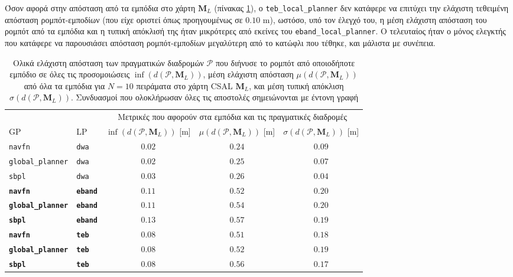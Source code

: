 Όσον αφορά στην απόσταση από τα εμπόδια στο χάρτη $\bm{M}_L$ (πίνακας
\ref{tbl:info_ground_truth_map_csal}), ο \texttt{teb\_local\_planner} δεν
κατάφερε να επιτύχει την ελάχιστη τεθειμένη απόσταση ρομπότ-εμποδίων (που είχε
οριστεί όπως προηγουμένως σε $0.10$ m), ωστόσο, υπό τον έλεγχό του, η μέση
ελάχιστη απόσταση του ρομπότ από τα εμπόδια και η τυπική απόκλισή της ήταν
μικρότερες από εκείνες του \texttt{eband\_local\_planner}. Ο τελευταίος ήταν ο
μόνος ελεγκτής που κατάφερε να παρουσιάσει απόσταση ρομπότ-εμποδίων μεγαλύτερη
από το κατώφλι που τέθηκε, και μάλιστα με συνέπεια.

\begin{table}[h]
\renewcommand{\arraystretch}{1.3}
\begin{tabular}{llccc}
  & & \multicolumn{3}{c}{Μετρικές που αφορούν στα εμπόδια και τις πραγματικές διαδρομές} \\
  \cline{3-5}
  GP & LP & $\inf(d(\bm{\mathcal{P}},\bm{M}_L))$ [m] & $\mu(d(\bm{\mathcal{P}},\bm{M}_L))$ [m] & $\sigma(d(\bm{\mathcal{P}},\bm{M}_L))$ [m] \\ \toprule
  \texttt{navfn} & \texttt{dwa} & $0.02$ & $0.24$ & $0.09$ \\
  \texttt{global\_planner} & \texttt{dwa} & $0.02$ & $0.25$ & $0.07$ \\
  \texttt{sbpl} & \texttt{dwa} & $0.03$ & $0.26$ & $0.04$ \\
  \textbf{\texttt{navfn}} & \textbf{\texttt{eband}} & $\bm{0.11}$ & $\bm{0.52}$ & $\bm{0.20}$ \\
  \textbf{\texttt{global\_planner}} & \textbf{\texttt{eband}} & $\bm{0.11}$ & $\bm{0.54}$ & $\bm{0.20}$ \\
  \textbf{\texttt{sbpl}} & \textbf{\texttt{eband}} & $\bm{0.13}$ & $\bm{0.57}$ & $\bm{0.19}$ \\
  \textbf{\texttt{navfn}} & \textbf{\texttt{teb}} & $\bm{0.08}$ & $\bm{0.51}$ & $\bm{0.18}$ \\
  \textbf{\texttt{global\_planner}} & \textbf{\texttt{teb}} & $\bm{0.08}$ & $\bm{0.52}$ & $\bm{0.19}$ \\
  \textbf{\texttt{sbpl}} & \textbf{\texttt{teb}} & $\bm{0.08}$ & $\bm{0.56}$ & $\bm{0.17}$ \\ \bottomrule
\end{tabular}
\caption{\small Ολικά ελάχιστη απόσταση των πραγματικών διαδρομών
         $\bm{\mathcal{P}}$ που διήνυσε το ρομπότ από οποιοδήποτε εμπόδιο σε
         όλες τις προσομοιώσεις $\inf(d(\bm{\mathcal{P}},\bm{M}_L))$, μέση
         ελάχιστη απόσταση $\mu(d(\bm{\mathcal{P}},\bm{M}_L))$ από όλα τα
         εμπόδια για $N=10$ πειράματα στο χάρτη CSAL $\bm{M}_L$, και μέση τυπική απόκλιση
         $\sigma(d(\bm{\mathcal{P}},\bm{M}_L))$. Συνδυασμοί που
         ολοκλήρωσαν όλες τις αποστολές σημειώνονται με έντονη γραφή}
\label{tbl:info_ground_truth_map_csal}
\end{table}

